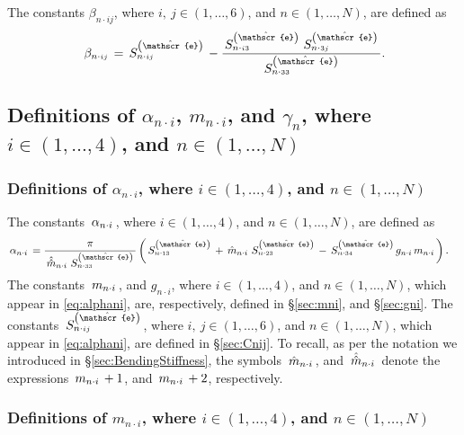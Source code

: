 \documentclass[preprint,12pt,times]{elsarticle}
\newcommand{\plus}[1]{\hat{#1}}
\newcommand{\plusplus}[1]{\plus{\plus{#1}}}
\numberwithin{equation}{section}
\newcommand{\physe}{\hat{\mathscr{e}}} %
\newcommand{\pr}[1]{\left( #1 \right)}
\newcommand{\msub}[2]{
\IfEqCase{#2}{
      {i}{\, m_{#1\cdot #2}\,}%
  }[\,m_{#1\cdot {\scriptscriptstyle #2}}\,]}
\newcommand{\gsub}[2]{g_{#1\cdot #2}}
\newcommand{\betasub}[2]{
\IfEqCase{#2}{
       {xxxx}{\,\beta_{ {#1}\cdot { #2}}\,}%
   }[\,\beta_{ {#1}\cdot {\scriptscriptstyle #2}}\,]}
\newcommand{\Csub}[2]{
   \IfEqCase{#2}{
          {xxxx}{\,\beta_{ {#1}\cdot { #2}}\,}%
      }[\,S^{\pr{\physe}}_{ {#1}\cdot {\scriptscriptstyle #2}}\,]}
\newcommand{\alphasub}[2]{
\IfEqCase{#2}{
		{i}{\,\alpha_{ {#1}\cdot { \scriptstyle #2}}\,}%
	}[\,\alpha_{ {#1}\cdot {\scriptscriptstyle #2}}\,]}
\newcommand{\infour}{\in(1,\ldots,4)}
\newcommand{\insix}{\in(1,\ldots,6)}
\newcommand{\inN}{\in(1,\ldots,N)}
\newcommand{\Subs}[3]{
\IfEqCase{#3}{
		{i}{\,#1_{ {#2}\cdot { \scriptstyle #3}}\,}%
	}[\,#1_{ {#2}\cdot {\scriptscriptstyle #3}}\,]}
\renewcommand{\>}{$\Rightarrow$}
\begin{document}
The constants $\beta_{n\cdot i j}$, where $i,~j\insix$, and $n\inN$, are defined as
\begin{equation}
\betasub{n}{ij} = \Csub{n}{ij}-\frac{\Csub{n}{i3} \Csub{n}{3j}}{\Csub{n}{33}}.
\label{eq:betanijdef}
\end{equation} %





\subsection{Definitions of $\alpha_{n\cdot i}$, $m_{n\cdot i}$, and $\gamma_{n}$, where $i\infour$, and $n\inN$\label{sec:alphamgni}} %


\subsubsection{Definitions of $\alpha_{n\cdot i}$, where $i\infour$, and $n\inN$\label{sec:alphani}} %

The constants $\alphasub{n}{i}$, where $i\infour$, and $n\inN$, are defined as
\begin{align}
	\alphasub{n}{i} & = \frac{\pi}{\Subs{\plusplus{m}}{n}{i} \Csub{n}{33}}\left(\Csub{n}{13} + \Subs{\plus{m}}{n}{i}\Csub{n}{23} - \Csub{n}{34} \gsub{n}{i} \msub{n}{i}\right).
\label{eq:alphani}
\end{align}%
The constants $\msub{n}{i}$, and $\gsub{n}{i}$, where $i\infour$, and $n\inN$, which appear in \eqref{eq:alphani}, are, respectively, defined in \S\ref{sec:mni}, and \S\ref{sec:gni}.%
The constants $\Csub{n}{ij}$, where $i,~j\insix$, and $n\inN$, which  appear in \eqref{eq:alphani}, are defined in \S\ref{sec:Cnij}. %
To recall, as per the notation we introduced in \S\ref{sec:BendingStiffness}, the symbols $\Subs{\plus{m}}{n}{i}$, and $\Subs{\plusplus{m}}{n}{i}$ denote the expressions $\Subs{m}{n}{i}+1$, and $\Subs{m}{n}{i}+2$, respectively. %

\subsubsection{Definitions of $m_{n\cdot i}$, where $i\infour$, and $n\inN$\label{sec:mni}}
\end{document}
